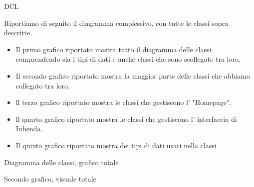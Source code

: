 \begin{listaPersonale}{DCL}
    \begin{center}
        
    \end{center}
    \newpage
        Riportiamo di seguito il diagramma complessivo, con tutte le classi sopra descritte.\\
        \begin{itemize}
        \item Il primo grafico riportato mostra tutto il diagramma delle classi comprendendo sia i tipi di dati e anche classi che sono scollegate tra loro.\\
        \item Il secondo grafico riportato mostra la maggior parte delle classi che abbiamo collegato tra loro.\\
        \item ll terzo grafico riportato mostra le classi che gestiscono l' "Homepage".\\
        \item ll quarto grafico riportato mostra le classi che gestiscono l' interfaccia di Iubenda.\\
        \item Il quinto grafico riportato mostra dei tipi di dati usati nella classi
        \end{itemize}
        \begin{center}
            
            Diagramma delle classi, grafico totale
        \end{center}
        \newpage
        \begin{center}
            
            Secondo grafico, visuale totale

\end{center}
\end{listaPersonale}
